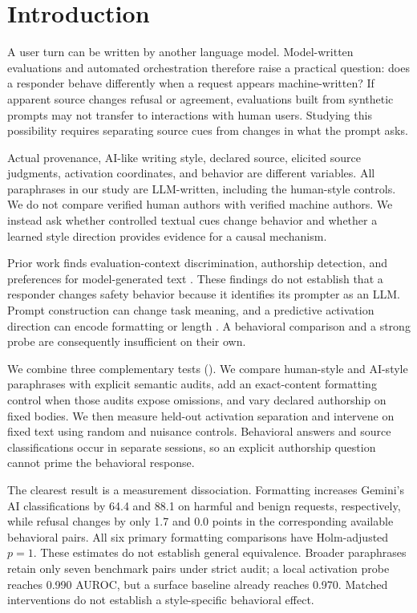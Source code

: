 \section{Introduction}
\label{sec:introduction}
A user turn can be written by another language model. Model-written evaluations and automated orchestration therefore raise a practical question: does a responder behave differently when a request appears machine-written? If apparent source changes refusal or agreement, evaluations built from synthetic prompts may not transfer to interactions with human users. Studying this possibility requires separating source cues from changes in what the prompt asks.

Actual provenance, AI-like writing style, declared source, elicited source judgments, activation coordinates, and behavior are different variables. All paraphrases in our study are LLM-written, including the human-style controls. We do not compare verified human authors with verified machine authors. We instead ask whether controlled textual cues change behavior and whether a learned style direction provides evidence for a causal mechanism.

Prior work finds evaluation-context discrimination, authorship detection, and preferences for model-generated text \cite{needham2025evaluated,quaremba2026probing,panickssery2024recognize}. These findings do not establish that a responder changes safety behavior because it identifies its prompter as an LLM. Prompt construction can change task meaning, and a predictive activation direction can encode formatting or length \cite{devbunova2026format,chalkidis2026templated}. A behavioral comparison and a strong probe are consequently insufficient on their own.

We combine three complementary tests (). We compare human-style and AI-style paraphrases with explicit semantic audits, add an exact-content formatting control when those audits expose omissions, and vary declared authorship on fixed bodies. We then measure held-out activation separation and intervene on fixed text using random and nuisance controls. Behavioral answers and source classifications occur in separate sessions, so an explicit authorship question cannot prime the behavioral response.

The clearest result is a measurement dissociation. Formatting increases Gemini's AI classifications by 64.4 and 88.1 \pp on harmful and benign requests, respectively, while refusal changes by only 1.7 and 0.0 points in the corresponding available behavioral pairs. All six primary formatting comparisons have Holm-adjusted $p=1$. These estimates do not establish general equivalence. Broader paraphrases retain only seven benchmark pairs under strict audit; a local activation probe reaches 0.990 AUROC, but a surface baseline already reaches 0.970. Matched interventions do not establish a style-specific behavioral effect.

